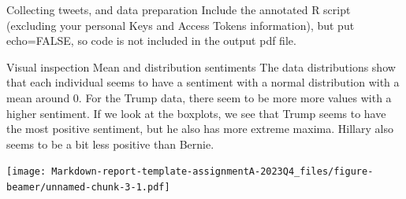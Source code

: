 \documentclass[
  ignorenonframetext,
]{beamer}
\newenvironment{Shaded}{\begin{snugshade}}{\end{snugshade}}
\newcommand{\AttributeTok}[1]{\textcolor[rgb]{0.77,0.63,0.00}{#1}}
\newcommand{\CommentTok}[1]{\textcolor[rgb]{0.56,0.35,0.01}{\textit{#1}}}
\newcommand{\FunctionTok}[1]{\textcolor[rgb]{0.00,0.00,0.00}{#1}}
\newcommand{\NormalTok}[1]{#1}
\newcommand{\OtherTok}[1]{\textcolor[rgb]{0.56,0.35,0.01}{#1}}
\newcommand{\SpecialCharTok}[1]{\textcolor[rgb]{0.00,0.00,0.00}{#1}}
\newcommand{\StringTok}[1]{\textcolor[rgb]{0.31,0.60,0.02}{#1}}
\begin{document}
\begin{frame}{Collecting tweets, and data preparation}
\protect\hypertarget{collecting-tweets-and-data-preparation}{}
Include the annotated R script (excluding your personal Keys and Access
Tokens information), but put echo=FALSE, so code is not included in the
output pdf file.
\end{frame}

\begin{frame}[fragile]{Visual inspection Mean and distribution
sentiments}
\protect\hypertarget{visual-inspection-mean-and-distribution-sentiments}{}
The data distributions show that each individual seems to have a
sentiment with a normal distribution with a mean around 0. For the Trump
data, there seem to be more more values with a higher sentiment. If we
look at the boxplots, we see that Trump seems to have the most positive
sentiment, but he also has more extreme maxima. Hillary also seems to be
a bit less positive than Bernie.

\begin{Shaded}
\end{Shaded}

\texttt{[image: Markdown-report-template-assignmentA-2023Q4\_files/figure-beamer/unnamed-chunk-3-1.pdf]}

\begin{Shaded}
\end{Shaded}


\end{frame}
\end{document}
